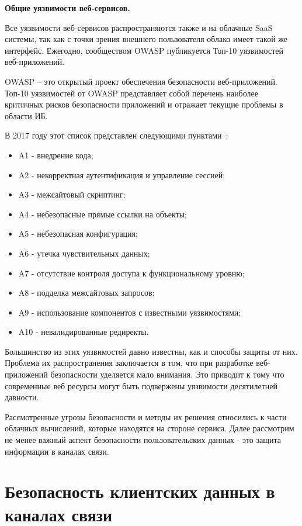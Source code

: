 \textbf{Общие уязвимости веб-сервисов.}

Все уязвимости веб-сервисов распространяются также и на облачные SaaS системы, так как с точки зрения внешнего пользователя облако имеет такой же интерфейс. Ежегодно, сообществом OWASP публикуется Топ-10 уязвимостей веб-приложений.

OWASP – это открытый проект обеспечения безопасности веб-приложений. Топ-10 уязвимостей от OWASP представляет собой перечень наиболее критичных рисков безопасности приложений и отражает текущие проблемы в области ИБ. 

В 2017 году этот список представлен следующими пунктами~\cite{OWASP}:

\begin{itemize}
	\item A1 - внедрение кода;
	\item A2 - некорректная аутентификация и управление сессией;
	\item A3 - межсайтовый скриптинг;
	\item A4 - небезопасные прямые ссылки на объекты;
	\item A5 - небезопасная конфигурация;
	\item A6 - утечка чувствительных данных;
	\item A7 - отсутствие контроля доступа к функциональному уровню;
	\item A8 - подделка межсайтовых запросов;
	\item A9 - использование компонентов с известными уязвимостями;
	\item A10 - невалидированные редиректы.
\end{itemize}

Большинство из этих уязвимостей давно известны, как и способы защиты от них. Проблема их распространения заключается в том, что при разработке веб-приложений безопасности уделяется мало внимания. Это приводит к тому что современные веб ресурсы могут быть подвержены уязвимости десятилетней давности.

Рассмотренные угрозы безопасности и методы их решения относились к части облачных вычислений, которые находятся на стороне сервиса. Далее рассмотрим не менее важный аспект безопасности пользовательских данных - это защита информации в каналах связи.

\section{Безопасность клиентских данных в каналах связи}

